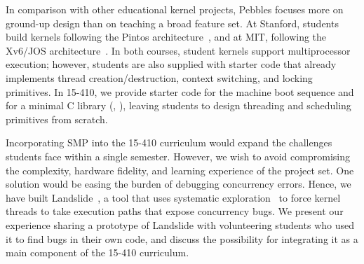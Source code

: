 In comparison with other educational kernel projects,
Pebbles focuses more on ground-up design than on teaching a broad feature set.
At Stanford, students build kernels following the Pintos architecture~\cite{pintos}, and at MIT, following the Xv6/JOS architecture~\cite{xv6}.
In both courses, student kernels support multiprocessor execution;
however, students are also supplied with starter code that already implements thread creation/destruction, context switching, and locking primitives.
In 15-410, we provide starter code for the machine boot sequence and for a minimal C library (, ), leaving students to design threading and scheduling primitives from scratch.

Incorporating SMP into the 15-410 curriculum would expand the challenges students face within a single semester.
However, we wish to avoid compromising the complexity, hardware fidelity, and learning experience of the project set.
One solution would be easing the burden of debugging concurrency errors.
Hence, we have built Landslide~\cite{landslide}, a tool that uses systematic exploration~\cite{verisoft} to force kernel threads to take execution paths that expose concurrency bugs.
We present our experience sharing a prototype of Landslide with volunteering students who used it to find bugs in their own code, and discuss the possibility for integrating it as a main component of the 15-410 curriculum.


